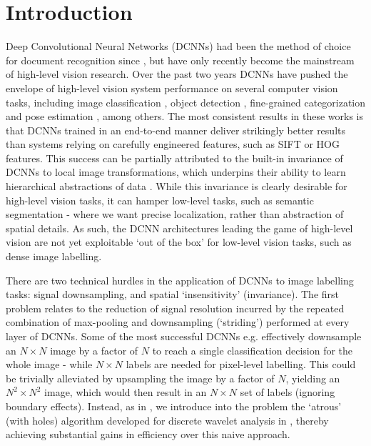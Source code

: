 \section{Introduction}
\label{sec:intro}
Deep Convolutional Neural Networks (DCNNs) had been the method of choice for document recognition since  \citet{LeCun1998}, but 
have only recently become the mainstream of high-level vision research.
Over the past two years  DCNNs have pushed the envelope of high-level vision system performance on several computer vision tasks, including image classification \citet{KrizhevskyNIPS2013, papandreou2014untangling, sermanet2013overfeat, simonyan2014very, szegedy2014going}, object detection \citet{girshick2014rcnn}, fine-grained categorization \citet{zhang2014part} and pose estimation \citet{chen2014articulated, tompson2014joint}, among others.
The most consistent results in these works is that DCNNs trained in an end-to-end manner  deliver  strikingly better results than systems relying on carefully engineered features, such as SIFT or HOG features.
This success can be partially attributed to the built-in  invariance of DCNNs to local image transformations, which underpins their ability to learn hierarchical abstractions of data \citep{zeiler2014visualizing}. While this invariance is clearly desirable for high-level vision tasks, it can hamper low-level tasks, such as semantic segmentation - where we want precise localization, rather than abstraction of spatial details.  As such, the DCNN architectures leading the game of high-level vision are not yet exploitable `out of the box' for low-level vision tasks, such as dense image labelling. 



There are two technical hurdles in the application of DCNNs to image labelling tasks: signal downsampling, and spatial `insensitivity' (invariance). 
The first problem relates to the reduction of signal resolution incurred by the repeated combination of max-pooling and downsampling (`striding') performed at every layer of DCNNs.  Some of the most successful  DCNNs e.g. 
\citep{KrizhevskyNIPS2013, simonyan2014very, szegedy2014going}
effectively downsample an $N\times N$ image by a factor of $N$ to reach 
a single  classification decision for the whole image - while $N \times N$ labels are needed for pixel-level labelling. This could  be trivially alleviated by upsampling the image by a factor of $N$, yielding an $N^2\times N^2$ image, which would then result in an $N\times N$ set of labels (ignoring boundary effects). Instead, as in  \cite{papandreou2014untangling}, we introduce into the problem the `atrous' (with holes) algorithm developed for  discrete wavelet analysis in  \cite{Mall99}, thereby achieving substantial gains in efficiency over this naive approach. 

